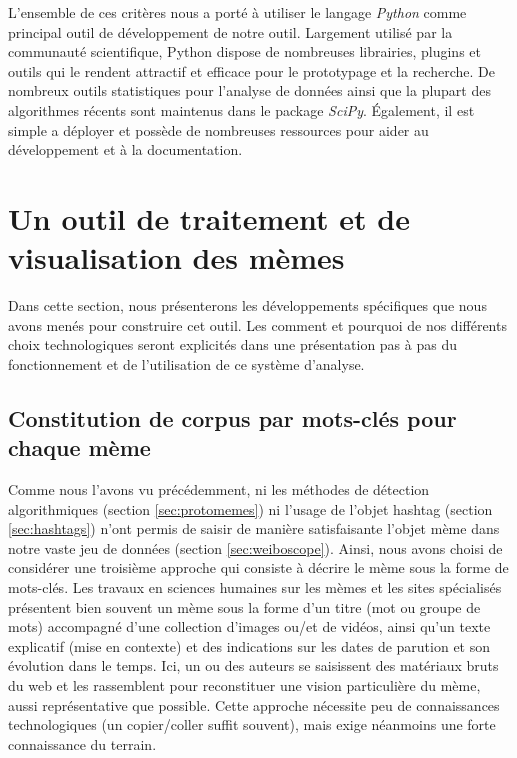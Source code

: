     L'ensemble de ces critères nous a porté à utiliser le langage \textit{Python} comme principal outil de développement de notre outil. Largement utilisé par la communauté scientifique, Python dispose de nombreuses librairies, plugins et outils qui le rendent attractif et efficace pour le prototypage et la recherche. De nombreux outils statistiques pour l'analyse de données ainsi que la plupart des algorithmes récents sont maintenus dans le package \textit{SciPy}. Également, il est simple a déployer et possède de nombreuses ressources pour aider au développement et à la documentation.

\section{Un outil de traitement et de visualisation des mèmes}

    Dans cette section, nous présenterons les développements spécifiques que nous avons menés pour construire cet outil. Les comment et pourquoi de nos différents choix technologiques seront explicités dans une présentation pas à pas du fonctionnement et de l'utilisation de ce système d'analyse.

\subsection[Constitution de corpus par mots-clés pour chaque mème]{Constitution de corpus par mots-clés pour chaque mème}
    \label{sec:keywords}

    Comme nous l'avons vu précédemment, ni les méthodes de détection algorithmiques (section \ref{sec:protomemes}) ni l'usage de l'objet hashtag (section \ref{sec:hashtags}) n'ont permis de saisir de manière satisfaisante l'objet mème dans notre vaste jeu de données (section \ref{sec:weiboscope}). Ainsi, nous avons choisi de considérer une troisième approche qui consiste à décrire le mème sous la forme de mots-clés. Les travaux en sciences humaines sur les mèmes \citep{Bauckhage2011, Coscia2013, Knobel2007} et les sites spécialisés \citep{Buchel2012, Bernstein2011} présentent bien souvent un mème sous la forme d{\textquoteright}un titre (mot ou groupe de mots) accompagné d{\textquoteright}une collection d{\textquoteright}images ou/et de vidéos, ainsi qu{\textquoteright}un texte explicatif (mise en contexte) et des indications sur les dates de parution et son évolution dans le temps. Ici, un ou des auteurs se saisissent des matériaux bruts du web et les rassemblent pour reconstituer une vision particulière du mème, aussi représentative que possible. Cette approche nécessite peu de connaissances technologiques (un copier/coller suffit souvent), mais exige néanmoins une forte connaissance du terrain. 

